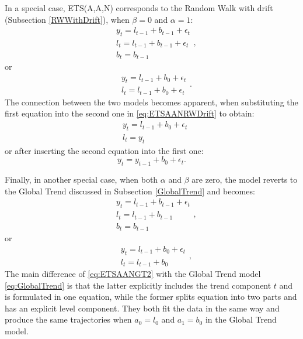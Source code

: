 \documentclass[
]{book}
\theoremstyle{definition}
\theoremstyle{definition}
\theoremstyle{definition}
\theoremstyle{definition}
\theoremstyle{remark}
\begin{document}
In a special case, ETS(A,A,N) corresponds to the Random Walk with drift (Subsection \ref{RWWithDrift}), when \(\beta=0\) and \(\alpha=1\):
\begin{equation*}
  \begin{aligned}
    & y_{t} = l_{t-1} + b_{t-1} + \epsilon_t \\
    & l_t = l_{t-1} + b_{t-1} + \epsilon_t \\
    & b_t = b_{t-1}
  \end{aligned} ,
\end{equation*}
or
\begin{equation}
  \begin{aligned}
    & y_{t} = l_{t-1} + b_{0} + \epsilon_t \\
    & l_t = l_{t-1} + b_{0} + \epsilon_t
  \end{aligned} .
  \label{eq:ETSAANRWDrift}
\end{equation}
The connection between the two models becomes apparent, when substituting the first equation into the second one in \eqref{eq:ETSAANRWDrift} to obtain:
\begin{equation}
  \begin{aligned}
    & y_{t} = l_{t-1} + b_{0} + \epsilon_t \\
    & l_t = y_{t}
  \end{aligned} 
\end{equation}
or after inserting the second equation into the first one:
\begin{equation}
  y_{t} = y_{t-1} + b_{0} + \epsilon_t .
\end{equation}

Finally, in another special case, when both \(\alpha\) and \(\beta\) are zero, the model reverts to the Global Trend discussed in Subsection \ref{GlobalTrend} and becomes:
\begin{equation*}
  \begin{aligned}
    & y_{t} = l_{t-1} + b_{t-1} + \epsilon_t \\
    & l_t = l_{t-1} + b_{t-1} \\
    & b_t = b_{t-1}
  \end{aligned} ,
\end{equation*}
or
\begin{equation}
  \begin{aligned}
    & y_{t} = l_{t-1} + b_{0} + \epsilon_t \\
    & l_t = l_{t-1} + b_{0}
  \end{aligned} ,
  \label{eq:ETSAANGT2}
\end{equation}
The main difference of \eqref{eq:ETSAANGT2} with the Global Trend model \eqref{eq:GlobalTrend} is that the latter explicitly includes the trend component \(t\) and is formulated in one equation, while the former splits equation into two parts and has an explicit level component. They both fit the data in the same way and produce the same trajectories when \(a_0 = l_0\) and \(a_1 = b_0\) in the Global Trend model.
\end{document}
